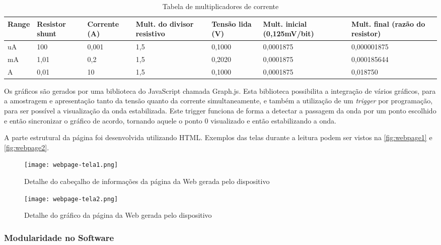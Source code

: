 \begin{table}[h!]
    \centering
    \caption{Tabela de multiplicadores de corrente}
    \begin{tabularx}{\textwidth}{|X|X|X|X|X|X|X|}
        \hline
        \textbf{Range} & \textbf{Resistor shunt} & \textbf{Corrente (A)} & \textbf{Mult. do divisor resistivo} & \textbf{Tensão lida (V)} & \textbf{Mult. inicial (0,125mV/bit)} & \textbf{Mult. final (razão do resistor)} \\
        \hline
        uA & 100 & 0,001 & 1,5 & 0,1000 & 0,0001875 & 0,000001875 \\
        mA & 1,01 & 0,2 & 1,5 & 0,2020 & 0,0001875 & 0,000185644 \\
        A & 0,01 & 10 & 1,5 & 0,1000 & 0,0001875 & 0,018750 \\
        \hline
    \end{tabularx}
    \label{tab:softw-corrente-values}
\end{table}


Os gráficos são gerados por uma biblioteca do JavaScript chamada Graph.js. Esta biblioteca possibilita a integração de vários gráficos, para a amostragem e apresentação tanto da tensão quanto da corrente simultaneamente, e também a utilização de um \textit{trigger} por programação, para ser possível a visualização da onda estabilizada. Este trigger funciona de forma a detectar a passagem da onda por um ponto escolhido e então sincronizar o gráfico de acordo, tornando aquele o ponto 0 visualizado e então estabilizando a onda.

A parte estrutural da página foi desenvolvida utilizando \gls{HTML}. Exemplos das telas durante a leitura podem ser vistos na \autoref{fig:webpage1} e \autoref{fig:webpage2}.

\begin{figure}[h!]
    \centering
    \caption{Detalhe do cabeçalho de informações da página da Web gerada pelo dispositivo}
    \texttt{[image: webpage-tela1.png]}
    \label{fig:webpage1}
    \fonte{}
\end{figure}

\begin{figure}[h!]
    \centering
    \caption{Detalhe do gráfico da página da Web gerada pelo dispositivo}
    \texttt{[image: webpage-tela2.png]}
    \label{fig:webpage2}
    \fonte{}
\end{figure}

\subsubsection{Modularidade no Software}\label{modular-softw}

